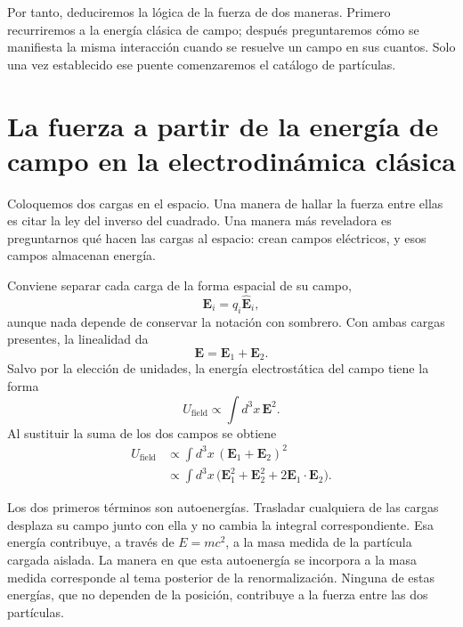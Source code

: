 Por tanto, deduciremos la lógica de la fuerza de dos maneras. Primero recurriremos a la energía clásica de campo; después preguntaremos cómo se manifiesta la misma interacción cuando se resuelve un campo en sus cuantos. Solo una vez establecido ese puente comenzaremos el catálogo de partículas.

\section{La fuerza a partir de la energía de campo en la electrodinámica clásica}

Coloquemos dos cargas en el espacio. Una manera de hallar la fuerza entre ellas es citar la ley del inverso del cuadrado. Una manera más reveladora es preguntarnos qué hacen las cargas al espacio: crean campos eléctricos, y esos campos almacenan energía.

Conviene separar cada carga de la forma espacial de su campo,
\begin{equation}
\mathbf E_i=q_i\widehat{\mathbf E}_i,
\end{equation}
aunque nada depende de conservar la notación con sombrero. Con ambas cargas presentes, la linealidad da
\begin{equation}
\mathbf{E}=\mathbf{E}_1+\mathbf{E}_2.
\end{equation}
Salvo por la elección de unidades, la energía electrostática del campo tiene la forma
\begin{equation}
U_{\text{field}}\propto\int d^3x\,\mathbf{E}^2.
\end{equation}
Al sustituir la suma de los dos campos se obtiene
\begin{align}
U_{\text{field}}
&\propto\int d^3x\,(\mathbf{E}_1+\mathbf{E}_2)^2 \\
&\propto\int d^3x\,\bigl(\mathbf{E}_1^2+\mathbf{E}_2^2
  +2\mathbf{E}_1\!\cdot\!\mathbf{E}_2\bigr).
\end{align}

Los dos primeros términos son autoenergías. Trasladar cualquiera de las cargas desplaza su campo junto con ella y no cambia la integral correspondiente. Esa energía contribuye, a través de \(E=mc^2\), a la masa medida de la partícula cargada aislada. La manera en que esta autoenergía se incorpora a la masa medida corresponde al tema posterior de la renormalización. Ninguna de estas energías, que no dependen de la posición, contribuye a la fuerza entre las dos partículas.

